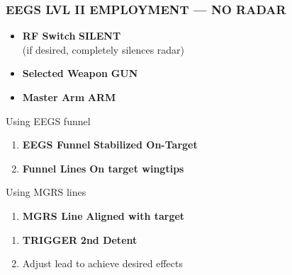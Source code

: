 \subsubsection{EEGS LVL II EMPLOYMENT --- NO RADAR}
\label{subsec:m61:eegslvl2}
\begin{checklistenumerate}
    \blueitem[Prerequisites]
    \begin{itemize}
        \item \textbf{RF Switch} \dotfill \textbf{SILENT} \\
        \hfill (if desired, completely silences radar)
        \item \textbf{Selected Weapon} \dotfill \textbf{GUN}
        \item \textbf{Master Arm} \dotfill \textbf{ARM}
    \end{itemize}

    \smallskip
    Using EEGS funnel

    \begin{enumerate}
        \item \textbf{EEGS Funnel} \dotfill \textbf{Stabilized On-Target}
        \item \textbf{Funnel Lines} \dotfill \textbf{On target wingtips}
    \end{enumerate}

    Using MGRS lines
    
    \begin{enumerate}
        \item \textbf{MGRS Line} \dotfill \textbf{Aligned with target}
    \end{enumerate}
    \begin{enumerate}
        \item \textbf{TRIGGER} \dotfill \textbf{2nd Detent}
        \item Adjust lead to achieve desired effects
    \end{enumerate}
\end{checklistenumerate}

